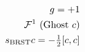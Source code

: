 \documentclass[preview]{standalone}
\begin{document}
\begin{align*}
\special{dvisvgm:raw <g id='unique000'>}g = +1\\\mathcal{F}^1\text{ (Ghost }c)\\s_{\text{BRST}}c=-\tfrac{1}{2}[c,c]\special{dvisvgm:raw </g>}
\end{align*}
\end{document}

